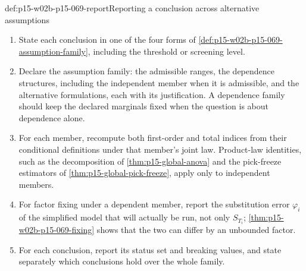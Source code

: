 \begin{hbmethod}{def:p15-w02b-p15-069-report}{Reporting a conclusion across alternative assumptions}
\begin{enumerate}
\item State each conclusion in one of the four forms of
 \cref{def:p15-w02b-p15-069-assumption-family}, including the threshold
 or screening level.
\item Declare the assumption family: the admissible ranges, the
 dependence structures, including the independent member when it is
 admissible, and the alternative formulations, each with its
 justification. A dependence family should keep the declared marginals
 fixed when the question is about dependence alone.
\item For each member, recompute both first-order and total indices from
 their conditional definitions under that member's joint law. Product-law
 identities, such as the decomposition of \cref{thm:p15-global-anova} and
 the pick-freeze estimators of \cref{thm:p15-global-pick-freeze}, apply
 only to independent members.
\item For factor fixing under a dependent member, report the substitution
 error \(\varphi_i\) of the simplified model that will actually be run, not
 only \(S_{T_i}\); \cref{thm:p15-w02b-p15-069-fixing} shows that the two
 can differ by an unbounded factor.
\item For each conclusion, report its status set and breaking values, and
 state separately which conclusions hold over the whole family.
\end{enumerate}
\end{hbmethod}

